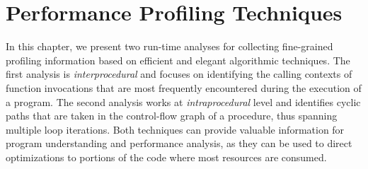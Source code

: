 \chapter{Performance Profiling Techniques}
\label{ch:profiling}

In this chapter, we present two run-time analyses for collecting fine-grained profiling information based on efficient and elegant algorithmic techniques. The first analysis is {\em interprocedural} and focuses on identifying the calling contexts of function invocations that are most frequently encountered during the execution of a program. The second analysis works at {\em intraprocedural} level and identifies cyclic paths that are taken in the control-flow graph of a procedure, thus spanning multiple loop iterations. Both techniques can provide valuable information for program understanding and performance analysis, as they can be used to direct optimizations to portions of the code where most resources are consumed.

\ifdefined\noauthorea

\newpage

\fi